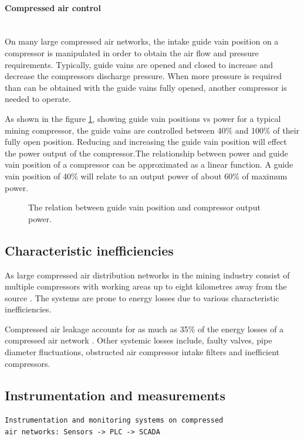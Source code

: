 \paragraph*{Compressed air control}\leavevmode\\
On many large compressed air networks, the intake guide vain position on a compressor is manipulated in order to obtain the air flow and pressure requirements. Typically, guide vains are opened and closed to increase and decrease the compressors discharge pressure. When more pressure is required than can be obtained with the guide vains fully opened, another compressor is needed to operate.\par
 As shown in the figure \ref{fig: Guide vain position}, showing guide vain positions vs power for a typical mining compressor, the guide vains are controlled between 40\% and 100\% of their fully open position. Reducing and increasing the guide vain position will effect the power output of the compressor.The relationship between power and guide vain position of a compressor can be approximated as a linear function. A guide vain position of 40\% will relate to an output power of about 60\% of maximum power.
 	\begin{figure}[h]
 	\centering
 	\fbox{}
 	\caption[The relation between guide vain position and compressor output power.]{The relation between guide vain position and compressor output power.}
 	\label{fig: Guide vain position}
 \end{figure}
 
	\subsection{Characteristic inefficiencies}
	As large compressed air distribution networks in the mining industry consist of multiple compressors with working areas up to eight kilometres away from the source \cite{Marais2012PhD}. The systems are prone to energy losses due to various characteristic inefficiencies. \par 
	Compressed air leakage accounts for as much as 35\% of the energy losses of a compressed air network \cite{Lawrence2004Improving}. Other systemic losses include, faulty valves, pipe diameter fluctuations, obstructed air compressor intake filters and inefficient compressors. \par
	\subsection{Instrumentation and measurements}
	\texttt{Instrumentation and monitoring systems on compressed\\ air networks: Sensors -> PLC -> SCADA}
